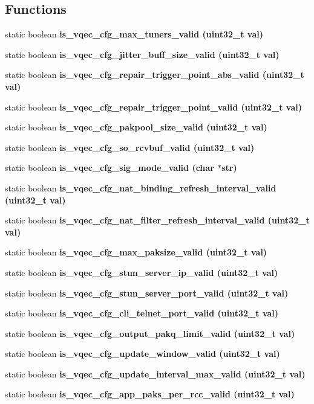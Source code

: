 \subsection*{Functions}
\begin{CompactItemize}
\item 
static boolean \bf{is\_\-vqec\_\-cfg\_\-max\_\-tuners\_\-valid} (uint32\_\-t val)
\item 
static boolean \bf{is\_\-vqec\_\-cfg\_\-jitter\_\-buff\_\-size\_\-valid} (uint32\_\-t val)
\item 
static boolean \bf{is\_\-vqec\_\-cfg\_\-repair\_\-trigger\_\-point\_\-abs\_\-valid} (uint32\_\-t val)
\item 
static boolean \bf{is\_\-vqec\_\-cfg\_\-repair\_\-trigger\_\-point\_\-valid} (uint32\_\-t val)
\item 
static boolean \bf{is\_\-vqec\_\-cfg\_\-pakpool\_\-size\_\-valid} (uint32\_\-t val)
\item 
static boolean \bf{is\_\-vqec\_\-cfg\_\-so\_\-rcvbuf\_\-valid} (uint32\_\-t val)
\item 
static boolean \bf{is\_\-vqec\_\-cfg\_\-sig\_\-mode\_\-valid} (char $\ast$str)
\item 
static boolean \bf{is\_\-vqec\_\-cfg\_\-nat\_\-binding\_\-refresh\_\-interval\_\-valid} (uint32\_\-t val)
\item 
static boolean \bf{is\_\-vqec\_\-cfg\_\-nat\_\-filter\_\-refresh\_\-interval\_\-valid} (uint32\_\-t val)
\item 
static boolean \bf{is\_\-vqec\_\-cfg\_\-max\_\-paksize\_\-valid} (uint32\_\-t val)
\item 
static boolean \bf{is\_\-vqec\_\-cfg\_\-stun\_\-server\_\-ip\_\-valid} (uint32\_\-t val)
\item 
static boolean \bf{is\_\-vqec\_\-cfg\_\-stun\_\-server\_\-port\_\-valid} (uint32\_\-t val)
\item 
static boolean \bf{is\_\-vqec\_\-cfg\_\-cli\_\-telnet\_\-port\_\-valid} (uint32\_\-t val)
\item 
static boolean \bf{is\_\-vqec\_\-cfg\_\-output\_\-pakq\_\-limit\_\-valid} (uint32\_\-t val)
\item 
static boolean \bf{is\_\-vqec\_\-cfg\_\-update\_\-window\_\-valid} (uint32\_\-t val)
\item 
static boolean \bf{is\_\-vqec\_\-cfg\_\-update\_\-interval\_\-max\_\-valid} (uint32\_\-t val)
\item 
static boolean \bf{is\_\-vqec\_\-cfg\_\-app\_\-paks\_\-per\_\-rcc\_\-valid} (uint32\_\-t val)
\item 

\end{CompactItemize}
